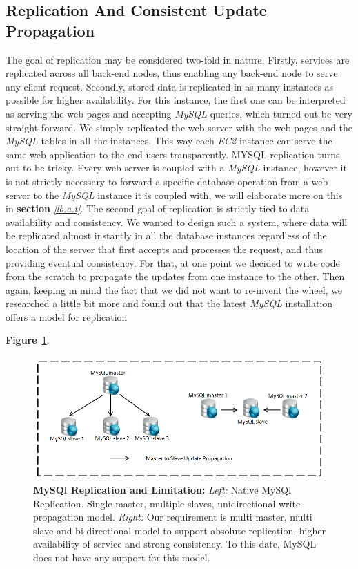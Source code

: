 \documentclass[12pt]{article}
\begin{document}
\subsection{Replication And Consistent Update Propagation} 
The goal of replication may be considered two-fold in nature. Firstly, services are
replicated across all back-end nodes, thus enabling any back-end node to serve
any client request. Secondly, stored data is replicated in as many instances as
possible for higher availability. For this instance, the first one can be
interpreted as serving the web pages and accepting \emph{MySQL} queries, which
turned out be very straight forward. We simply replicated the web server with
the web pages and the \emph{MySQL} tables in all the instances. This way each
\emph{EC2} instance can serve the same web application to the end-users
transparently. MYSQL replication turns out to be tricky. Every web server is
coupled with a \emph{MySQL} instance, however it is not strictly necessary to
forward a specific database operation from a web server to the \emph{MySQL}
instance it is coupled with, we will elaborate more on this in \textbf{section}
\emph{\ref{lb.a.t}}. The second goal of replication is strictly tied to data
availability and consistency. We wanted to design such a system, where data will
be replicated almost instantly in all the database instances regardless of the
location of the server that first accepts and processes the request, and thus
providing eventual consistency. For that, at one point we decided to write code
from the scratch to propagate the updates from one instance to the other. Then
again, keeping in mind the fact that we did not want to re-invent the wheel, we
researched a little bit more and found out that the latest \emph{MySQL}
installation offers a model for replication \cite{mysql-replication}

\textbf{Figure}~\ref{fig:mysqlreplication}.  
\begin{figure}[H] \centering
\includegraphics[scale=0.80]{Images/figure6.PNG} 
\caption{\textbf{MySQl Replication and Limitation:} 
\emph{Left: }Native MySQl Replication. Single master, multiple slaves, unidirectional 
write propagation model.  
\emph{Right:}
Our requirement is multi master, multi slave and bi-directional model to support
absolute replication, higher availability of service and strong consistency. To
this date, MySQL does not have any support for this model.}
\label{fig:mysqlreplication} 
\end{figure} 
\end{document}
